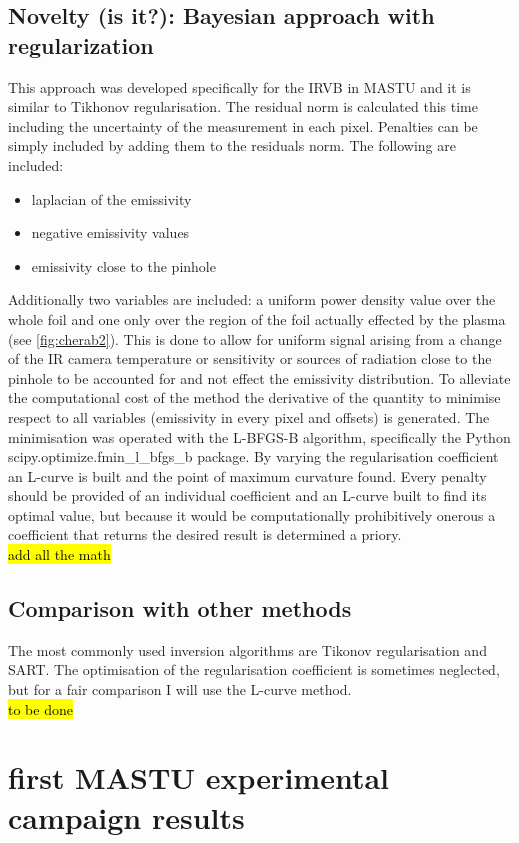 \subsection{Novelty (is it?): Bayesian approach with regularization}
This approach was developed specifically for the IRVB in MASTU and it is similar to Tikhonov regularisation. The residual norm is calculated this time including the uncertainty of the measurement in each pixel. Penalties can be simply included by adding them to the residuals norm. The following are included:
\begin{itemize}
\item laplacian of the emissivity
\item negative emissivity values
\item emissivity close to the pinhole
\end{itemize}
Additionally two variables are included: a uniform power density value over the whole foil and one only over the region of the foil actually effected by the plasma (see \autoref{fig:cherab2}). This is done to allow for uniform signal arising from a change of the IR camera temperature or sensitivity or sources of radiation close to the pinhole to be accounted for and not effect the emissivity distribution.
To alleviate the computational cost of the method the derivative of the quantity to minimise respect to all variables (emissivity in every pixel and offsets) is generated. The minimisation was operated with the L-BFGS-B algorithm, specifically the Python scipy.optimize.fmin\_l\_bfgs\_b package. \cite{Morales2011}
By varying the regularisation coefficient an L-curve is built and the point of maximum curvature found.
Every penalty should be provided of an individual coefficient and an L-curve built to find its optimal value, but because it would be computationally prohibitively onerous a coefficient that returns the desired result is determined a priory.\\
\hl{add all the math}
\subsection{Comparison with other methods}
The most commonly used inversion algorithms are Tikonov regularisation and SART. The optimisation of the regularisation coefficient is sometimes neglected, but for a fair comparison I will use the L-curve method.\\
\hl{to be done}

\section{first MASTU experimental campaign results}
